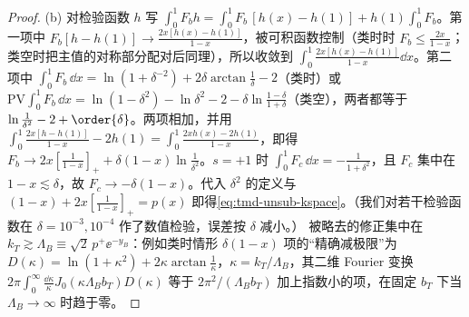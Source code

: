 \begin{proof}
(b) 对检验函数 $h$ 写 $\int_0^1F_bh=\int_0^1F_b\,[h(x)-h(1)]+h(1)\int_0^1F_b$。第一项中 $F_b[h-h(1)]\to\frac{2x[h(x)-h(1)]}{1-x}$，被可积函数控制（类时时 $F_b\le\frac{2x}{1-x}$；类空时把主值的对称部分配对后同理），所以收敛到 $\int_0^1\frac{2x[h(x)-h(1)]}{1-x}\dd x$。第二项中 $\int_0^1F_b\,\dd x=\ln(1+\delta^{-2})+2\delta\arctan\frac1\delta-2$（类时）或 $\mathrm{PV}\!\int_0^1F_b\,\dd x=\ln(1-\delta^2)-\ln\delta^2-2-\delta\ln\frac{1-\delta}{1+\delta}$（类空），两者都等于 $\ln\frac1{\delta^2}-2+\order{\delta}$。两项相加，并用 $\int_0^1\frac{2x[h-h(1)]}{1-x}-2h(1)=\int_0^1\frac{2xh(x)-2h(1)}{1-x}$，即得 $F_b\to2x[\frac1{1-x}]_++\delta(1-x)\ln\frac1{\delta^2}$。$s=+1$ 时 $\int_0^1F_c\,\dd x=-\frac1{1+\delta^2}$，且 $F_c$ 集中在 $1-x\lesssim\delta$，故 $F_c\to-\delta(1-x)$。代入 $\delta^2$ 的定义与 $(1-x)+2x[\frac1{1-x}]_+=p(x)$ 即得\cref{eq:tmd-unsub-kspace}。（我们对若干检验函数在 $\delta=10^{-3},10^{-4}$ 作了数值检验，误差按 $\delta$ 减小。）%
被略去的修正集中在 $k_T\gtrsim\Lambda_B\equiv\sqrt2\,p^+\ee^{-y_B}$：例如类时情形 $\delta(1-x)$ 项的“精确减极限”为 $D(\kappa)=\ln(1+\kappa^2)+2\kappa\arctan\frac1\kappa$，$\kappa=k_T/\Lambda_B$，其二维 Fourier 变换 $2\pi\int_0^\infty\frac{\dd\kappa}{\kappa}J_0(\kappa\Lambda_Bb_T)D(\kappa)$ 等于 $2\pi^2/(\Lambda_Bb_T)$ 加上指数小的项，在固定 $b_T$ 下当 $\Lambda_B\to\infty$ 时趋于零。


\end{proof}
